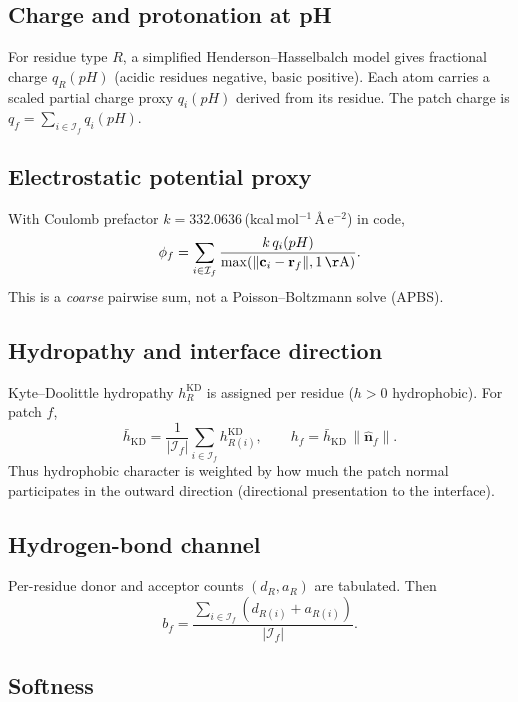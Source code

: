 \documentclass[11pt,a4paper]{article}
\begin{document}
\subsection{Charge and protonation at pH}

For residue type $R$, a simplified Henderson--Hasselbalch model gives fractional
charge $q_R(pH)$ (acidic residues negative, basic positive). Each atom carries a
scaled partial charge proxy $q_i(pH)$ derived from its residue. The patch charge is
$q_f=\sum_{i\in\mathcal{I}_f} q_i(pH)$.

\subsection{Electrostatic potential proxy}

With Coulomb prefactor $k=332.0636$\,(kcal\,mol$^{-1}$\,\AA\,e$^{-2}$) in code,
\begin{equation}
  \phi_f = \sum_{i\in\mathcal{I}_f} \frac{k\, q_i(pH)}{\max(\|\mathbf{c}_i-\mathbf{r}_f\|,1\,\mathrm{\AA})}.
\end{equation}
This is a \emph{coarse} pairwise sum, not a Poisson--Boltzmann solve (APBS).

\subsection{Hydropathy and interface direction}

Kyte--Doolittle hydropathy $h^{\mathrm{KD}}_R$ is assigned per residue ($h>0$
hydrophobic). For patch $f$,
\begin{equation}
  \bar{h}_{\mathrm{KD}} = \frac{1}{|\mathcal{I}_f|}\sum_{i\in\mathcal{I}_f} h^{\mathrm{KD}}_{R(i)},
  \qquad
  h_f = \bar{h}_{\mathrm{KD}}\,\|\hat{\mathbf{n}}_f\|.
\end{equation}
Thus hydrophobic character is weighted by how much the patch normal participates
in the outward direction (directional presentation to the interface).

\subsection{Hydrogen-bond channel}

Per-residue donor and acceptor counts $(d_R,a_R)$ are tabulated. Then
\begin{equation}
  b_f = \frac{\sum_{i\in\mathcal{I}_f}(d_{R(i)}+a_{R(i)})}{|\mathcal{I}_f|}.
\end{equation}

\subsection{Softness}
\end{document}
